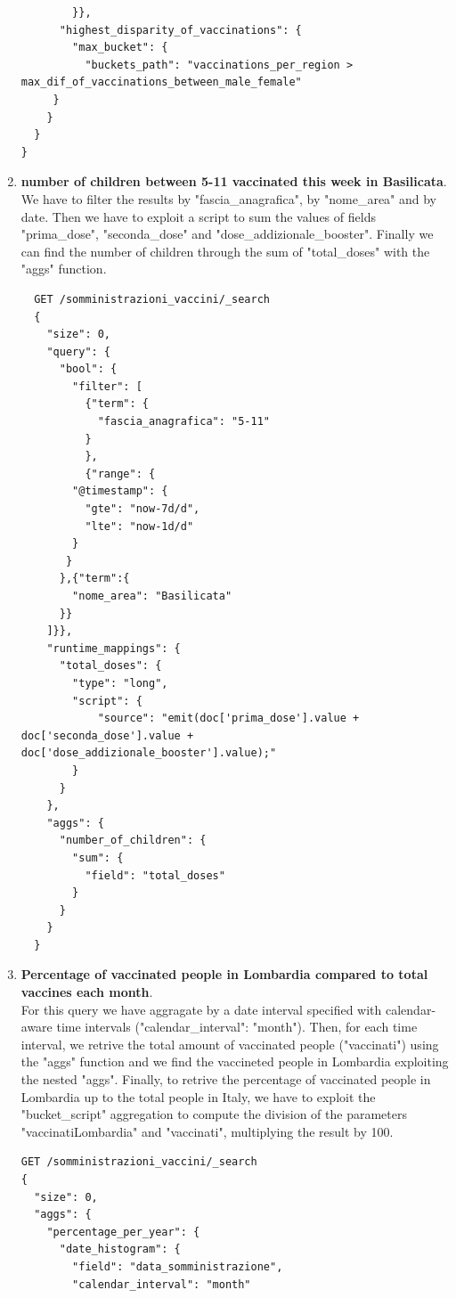 \documentclass{article}
\begin{document}
\begin{enumerate}
\begin{lstlisting}
        }},
      "highest_disparity_of_vaccinations": {
        "max_bucket": {
          "buckets_path": "vaccinations_per_region > max_dif_of_vaccinations_between_male_female" 
     }
    }
  }
}
\end{lstlisting}
\item \textbf{number of children between 5-11 vaccinated this week in Basilicata}.\\We have to filter the results by "fascia\_anagrafica", by "nome\_area" and by date. Then we have to exploit a script to sum the values of fields "prima\_dose", "seconda\_dose" and "dose\_addizionale\_booster". Finally we can find the number of children through the sum of "total\_doses" with the "aggs" function.
\begin{lstlisting}
  GET /somministrazioni_vaccini/_search
  {
    "size": 0,
    "query": {
      "bool": {
        "filter": [
          {"term": {
            "fascia_anagrafica": "5-11"
          }
          },
          {"range": {
        "@timestamp": {
          "gte": "now-7d/d",
          "lte": "now-1d/d"
        }
       }
      },{"term":{
        "nome_area": "Basilicata"
      }}
    ]}},
    "runtime_mappings": {
      "total_doses": {
        "type": "long",
        "script": {
            "source": "emit(doc['prima_dose'].value + doc['seconda_dose'].value + doc['dose_addizionale_booster'].value);"
        }
      }
    },
    "aggs": {
      "number_of_children": {
        "sum": {
          "field": "total_doses"
        }
      }
    }
  }
\end{lstlisting}
\item \textbf{Percentage of vaccinated people in Lombardia compared to total vaccines each month}.\\
For this query we have aggragate by a date interval specified with calendar-aware time intervals ("calendar\_interval": "month"). Then, for each time interval, we retrive the total amount of vaccinated people ("vaccinati") using the "aggs" function and we find the vaccineted people in Lombardia exploiting the nested "aggs". Finally, to retrive the percentage of vaccinated people in Lombardia up to the total people in Italy, we have to exploit the "bucket\_script" aggregation to compute the division of the parameters "vaccinatiLombardia" and "vaccinati", multiplying the result by 100.
\begin{lstlisting}
GET /somministrazioni_vaccini/_search
{ 
  "size": 0,
  "aggs": {
    "percentage_per_year": {
      "date_histogram": {
        "field": "data_somministrazione",
        "calendar_interval": "month"

\end{lstlisting}
\end{enumerate}
\end{document}
